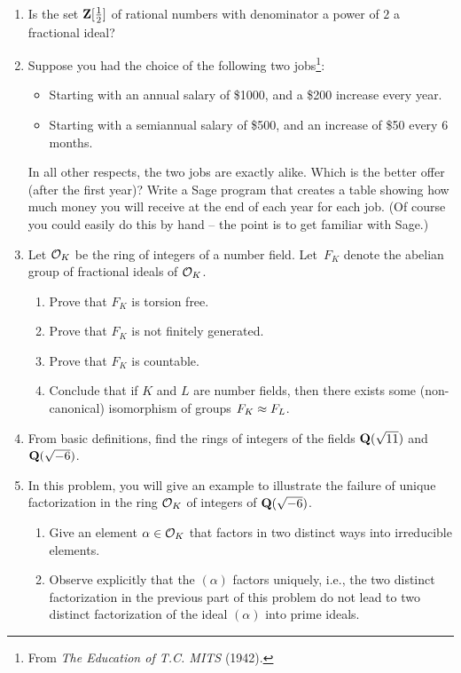 \begin{enumerate}
\item Is the set $\mathbf{Z}[\frac{1}{2}]$ of rational numbers with
  denominator a power of $2$ a fractional ideal?

\item Suppose you had the choice of the following two jobs\footnote{From {\em The Education of T.C. MITS} (1942).}:
\begin{itemize}
\item[Job 1] Starting with an annual salary of \$1000,
and a \$200 increase every year.
\item[Job 2] Starting with a semiannual salary of \$500,
and an increase of \$50 every 6 months.
\end{itemize}
In all other respects, the two jobs are exactly alike.
Which is the better offer (after the first year)?  
Write a Sage program that creates a table showing how
much money you will receive at the end of each year for
each job. (Of course you could easily do this by hand -- the
point is to get familiar with Sage.)

\item Let $\mathcal{O}_K$ be the ring of integers of a number field.
Let~$F_K$ denote the abelian group of fractional ideals of $\mathcal{O}_K$.
\begin{enumerate}
\item Prove that $F_K$ is torsion free.
\item Prove that $F_K$ is not finitely generated.
\item Prove that $F_K$ is countable.
\item Conclude that if $K$ and $L$ are number fields, then there
exists some (non-canonical) isomorphism of groups $F_K\approx F_L$.
\end{enumerate}

\item From basic definitions, find the rings of integers of the fields
$\mathbf{Q}(\sqrt{11})$ and $\mathbf{Q}(\sqrt{-6})$.

\item In this problem, you will give an example to illustrate the
  failure of unique factorization in the ring $\mathcal{O}_K$ of integers of
  $\mathbf{Q}(\sqrt{-6})$.
\begin{enumerate}
\item Give an element $\alpha \in \mathcal{O}_K$ that factors in two distinct
  ways into irreducible elements.  
\item Observe explicitly that the $(\alpha)$ factors uniquely, i.e.,
  the two distinct factorization in the previous part of this problem
  do not lead to two distinct factorization of the ideal $(\alpha)$
  into prime ideals.
\end{enumerate}



\end{enumerate}
